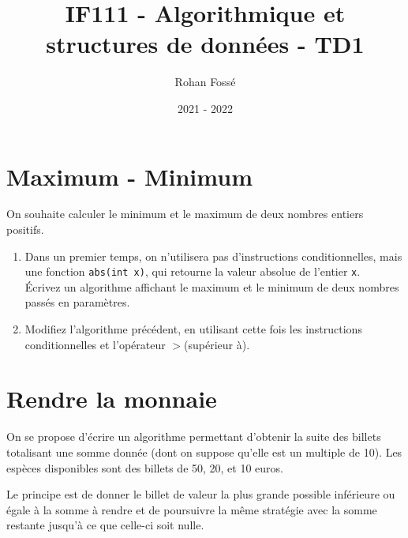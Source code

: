\documentclass[10pt,a4paper]{article}
\title{IF111 - Algorithmique et structures de données - TD1}
\date{2021 - 2022}
\author{Rohan Fossé}
\begin{document}
\maketitle

\section{Maximum - Minimum}

On souhaite calculer le minimum et le maximum de deux nombres entiers positifs. 
\begin{enumerate}
	\item Dans un premier temps, on n'utilisera pas d'instructions conditionnelles, mais une fonction \verb+abs(int x)+, qui retourne la valeur absolue de l'entier \verb+x+. \\
Écrivez un algorithme affichant le maximum et le minimum de deux nombres passés en paramètres.

	
\item Modifiez l'algorithme précédent, en utilisant cette fois les instructions conditionnelles et l'opérateur $>$(supérieur à).

\end{enumerate}


\section{Rendre la monnaie}

On se propose d'écrire un algorithme permettant d'obtenir la suite des billets totalisant une somme donnée (dont on suppose qu'elle est un multiple de 10).
Les espèces disponibles sont des billets de 50, 20, et 10 euros.

Le principe est de donner le billet de valeur la plus grande possible inférieure ou égale à la somme à rendre et de poursuivre la même stratégie avec la somme restante jusqu'à ce que celle-ci soit nulle.
\end{document}

